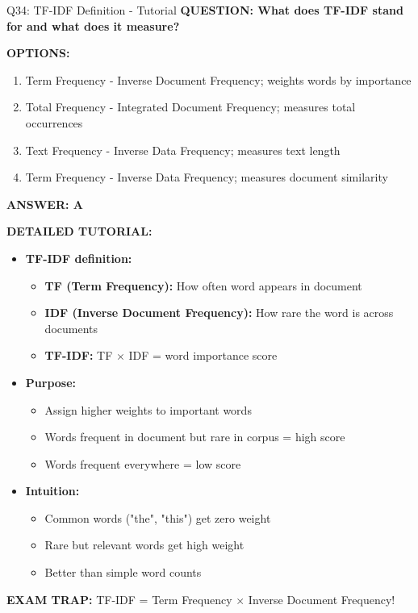 \documentclass[8pt]{beamer}
\begin{document}
	\begin{frame}{Q34: TF-IDF Definition - Tutorial}
		\fontsize{6.5}{7.5}\selectfont
		\textbf{QUESTION: What does TF-IDF stand for and what does it measure?}
		
		\vspace{0.1cm}
		\textbf{OPTIONS:}
		\begin{enumerate}
			\item Term Frequency - Inverse Document Frequency; weights words by importance
			\item Total Frequency - Integrated Document Frequency; measures total occurrences
			\item Text Frequency - Inverse Data Frequency; measures text length
			\item Term Frequency - Inverse Data Frequency; measures document similarity
		\end{enumerate}
		
		\vspace{0.1cm}
		\textcolor{myblue}{\textbf{ANSWER: A}}
		
		\vspace{0.1cm}
		\textbf{DETAILED TUTORIAL:}
		\begin{itemize}
			\item \textbf{TF-IDF definition:}
			\begin{itemize}
				\item \textbf{TF (Term Frequency):} How often word appears in document
				\item \textbf{IDF (Inverse Document Frequency):} How rare the word is across documents
				\item \textbf{TF-IDF:} TF $\times$ IDF = word importance score
			\end{itemize}
			\item \textbf{Purpose:}
			\begin{itemize}
				\item Assign higher weights to important words
				\item Words frequent in document but rare in corpus = high score
				\item Words frequent everywhere = low score
			\end{itemize}
			\item \textbf{Intuition:}
			\begin{itemize}
				\item Common words ("the", "this") get zero weight
				\item Rare but relevant words get high weight
				\item Better than simple word counts
			\end{itemize}
		\end{itemize}
		
		\textcolor{myred}{\textbf{EXAM TRAP:}} TF-IDF = \textcolor{myblue}{Term Frequency $\times$ Inverse Document Frequency}!
	\end{frame}
	
\end{document}
